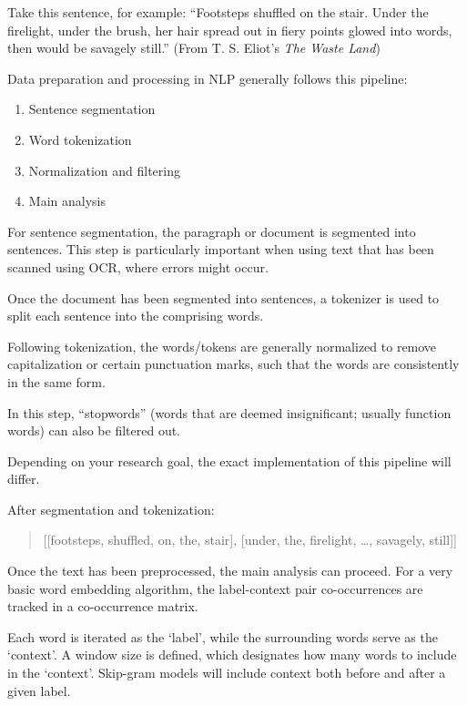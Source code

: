 Take this sentence, for example: ``Footsteps shuffled on the stair. Under the firelight, under the brush, her hair spread out in fiery points glowed into words, then would be savagely still.'' (From T. S. Eliot's \textit{The Waste Land})

Data preparation and processing in NLP generally follows this pipeline: 

\begin{enumerate}
\item Sentence segmentation
\item Word tokenization
\item Normalization and filtering
\item Main analysis
\end{enumerate}

For sentence segmentation, the paragraph or document is segmented into sentences. This step is particularly important when using text that has been scanned using OCR, where errors might occur.

Once the document has been segmented into sentences, a tokenizer is used to split each sentence into the comprising words. 

Following tokenization, the words/tokens are generally normalized to remove capitalization or certain punctuation marks, such that the words are consistently in the same form.

In this step, ``stopwords'' (words that are deemed insignificant; usually function words) can also be filtered out.

Depending on your research goal, the exact implementation of this pipeline will differ.


After segmentation and tokenization: 
\begin{quote}
[[footsteps, shuffled, on, the, stair], 
[under, the, firelight, \dots, savagely, still]]
\end{quote}

Once the text has been preprocessed, the main analysis can proceed. For a very basic word embedding algorithm, the label-context pair co-occurrences are tracked in a co-occurrence matrix.

Each word is iterated as the `label', while the surrounding words serve as the `context'. A window size is defined, which designates how many words to include in the `context'. Skip-gram models will include context both before and after a given label.

